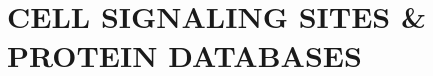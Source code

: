 \chapter{CELL SIGNALING SITES \& PROTEIN DATABASES}
\label{APP:A}
\vspace{0.5in}
\renewcommand{\baselinestretch}{0.8}
{\ssp

\endsinglespace}
\renewcommand{\baselinestretch}{2}
